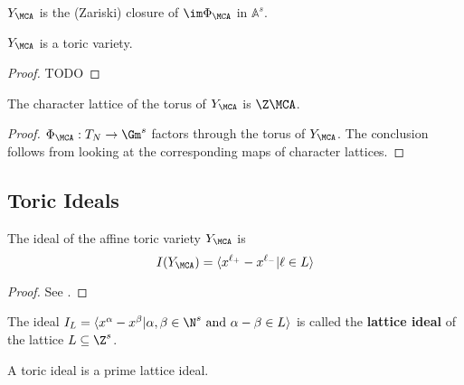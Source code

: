 \begin{definition}
  \label{1-1-7-ya}

  $Y_\MCA$ is the (Zariski) closure of $\im \Phi_\MCA$ in $\mathbb A^s$.
\end{definition}


\begin{proposition}
  \label{1-1-8-aff-tor-var-ya}

  $Y_\MCA$ is a toric variety.
\end{proposition}
\begin{proof}

  TODO
\end{proof}

\begin{proposition}
  \label{1-1-8-char-ya}

  The character lattice of the torus of $Y_\MCA$ is $\Z \MCA$.
\end{proposition}
\begin{proof}

  $\Phi_\MCA: T_N \to \Gm^s$ factors through the torus of $Y_\MCA$.
  The conclusion follows from looking at the corresponding maps of character lattices.
\end{proof}

\subsection{Toric Ideals}


\begin{proposition}
  \label{1-1-9-ideal-ya}

  The ideal of the affine toric variety $Y_\MCA$ is
  \[
    I(Y_\MCA) = \langle x^{\ell_+} - x^{\ell_-} | \ell \in L\rangle
  \]
\end{proposition}
\begin{proof}
  \uses{}

  See \cite{Cox_2011}.
\end{proof}


\begin{definition}
  \label{1-1-10-lattice-ideal}
  \uses{}
  \leanok

  The ideal $I_L = \langle x^\alpha - x^\beta | \alpha, \beta \in \N^s \text{ and } \alpha - \beta \in L\rangle$ is called the {\bf lattice ideal} of the lattice $L \subseteq \Z^s$.

  A toric ideal is a prime lattice ideal.
\end{definition}


